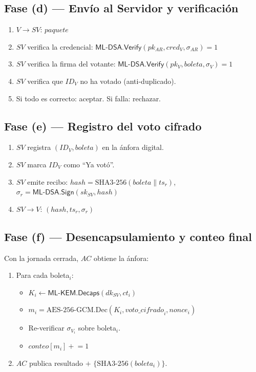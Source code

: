 \documentclass[12pt,a4paper,twoside,openright]{book}
\theoremstyle{plain}
\theoremstyle{definition}
\theoremstyle{remark}
\newcommand{\MLKEM}{\textsf{ML-KEM}}
\newcommand{\MLDSA}{\textsf{ML-DSA}}
\newcommand{\Decaps}{\mathsf{Decaps}}
\newcommand{\Sign}{\mathsf{Sign}}
\newcommand{\Verify}{\mathsf{Verify}}
\begin{document}
\subsection{Fase (d) --- Env\'io al Servidor y verificaci\'on}

\begin{enumerate}
  \item $V \to SV$: $\mathit{paquete}$
  \item $SV$ verifica la credencial: $\MLDSA.\Verify(pk_{AR}, \mathit{cred}_V, \sigma_{AR}) = 1$
  \item $SV$ verifica la firma del votante: $\MLDSA.\Verify(pk_V, \mathit{boleta}, \sigma_V) = 1$
  \item $SV$ verifica que $ID_V$ no ha votado (anti-duplicado).
  \item Si todo es correcto: aceptar. Si falla: rechazar.
\end{enumerate}

\subsection{Fase (e) --- Registro del voto cifrado}

\begin{enumerate}
  \item $SV$ registra $(\mathit{ID}_V, \mathit{boleta})$ en la \'anfora digital.
  \item $SV$ marca $ID_V$ como ``Ya vot\'o''.
  \item $SV$ emite recibo:
    $\mathit{hash} = \mathrm{SHA3\text{-}256}(\mathit{boleta} \| ts_r)$,\quad
    $\sigma_r = \MLDSA.\Sign(sk_{SV}, \mathit{hash})$
  \item $SV \to V$: $(\mathit{hash}, ts_r, \sigma_r)$
\end{enumerate}

\subsection{Fase (f) --- Desencapsulamiento y conteo final}

Con la jornada cerrada, $AC$ obtiene la \'anfora:
\begin{enumerate}
  \item Para cada boleta$_i$:
    \begin{itemize}
      \item $K_i \leftarrow \MLKEM.\Decaps(dk_{SV}, ct_i)$
      \item $m_i = \mathrm{AES\text{-}256\text{-}GCM.Dec}(K_i, \mathit{voto\_cifrado}_i, \mathit{nonce}_i)$
      \item Re-verificar $\sigma_{V_i}$ sobre boleta$_i$.
      \item $\mathit{conteo}[m_i] \mathrel{+}= 1$
    \end{itemize}
  \item $AC$ publica resultado $+$ $\{\mathrm{SHA3\text{-}256}(\mathit{boleta}_i)\}$.
\end{enumerate}
\end{document}
